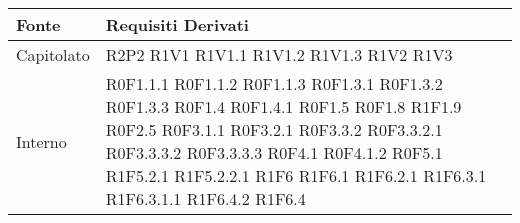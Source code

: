 	\begin{center}

	\def\arraystretch{1.5}
	\bgroup
	\begin{longtable}{| p{4cm} | p{4cm} |}

		\hline
		\textbf{Fonte} & \textbf{Requisiti Derivati} \\
		\hline

		Capitolato  &  R2P2 \newline R1V1 \newline R1V1.1 \newline R1V1.2 \newline R1V1.3 \newline R1V2 \newline R1V3 \\
		\hline
		Interno  &  R0F1.1.1 \newline R0F1.1.2 \newline R0F1.1.3 \newline R0F1.3.1 \newline R0F1.3.2 \newline R0F1.3.3 \newline R0F1.4 \newline R0F1.4.1 \newline R0F1.5 \newline R0F1.8 \newline R1F1.9 \newline R0F2.5 \newline R0F3.1.1 \newline R0F3.2.1 \newline R0F3.3.2 \newline R0F3.3.2.1 \newline R0F3.3.3.2 \newline R0F3.3.3.3 \newline R0F4.1 \newline R0F4.1.2 \newline R0F5.1 \newline R1F5.2.1 \newline R1F5.2.2.1 \newline R1F6 \newline R1F6.1 \newline R1F6.2.1 \newline R1F6.3.1 \newline R1F6.3.1.1 \newline R1F6.4.2 \newline R1F6.4
\end{longtable}
\end{center}
